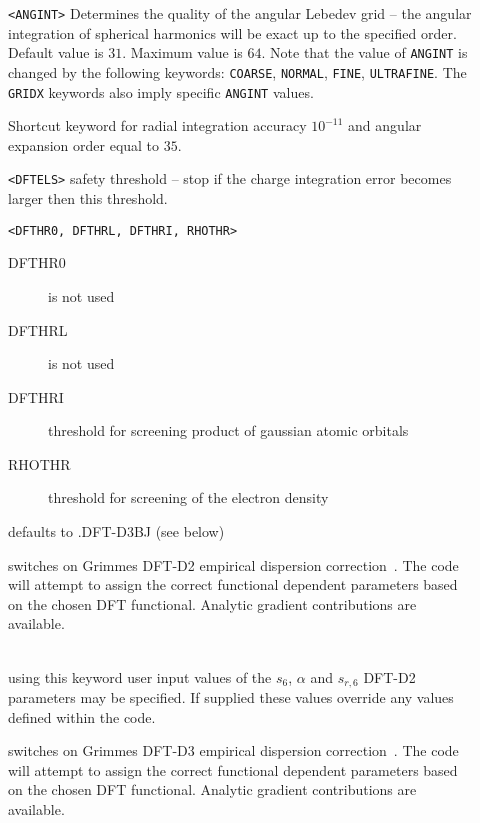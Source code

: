 \begin{description}
\item[] \verb||\newline
\verb|<ANGINT>|\newline
Determines the quality of the angular Lebedev grid -- the angular
integration of spherical harmonics will be exact up to the specified
order. Default value is $31$. Maximum value is $64$.
Note that the value of \verb|ANGINT| is changed by the following keywords:
\verb|COARSE|, \verb|NORMAL|, \verb|FINE|, \verb|ULTRAFINE|.
The \verb|GRIDX| keywords also imply specific \verb|ANGINT| values.
\item[]
Shortcut keyword for radial integration accuracy $10^{-11}$ and angular expansion order equal to $35$.
\item[] \verb||\newline
\verb|<DFTELS>|\newline
safety threshold -- stop if the charge integration error becomes larger then this threshold.
\item[]\verb||\newline
\verb|<DFTHR0, DFTHRL, DFTHRI, RHOTHR>|
\begin{description}
\item[DFTHR0] is not used 
\item[DFTHRL] is not used 
\item[DFTHRI] threshold for screening product of gaussian atomic orbitals
\item[RHOTHR] threshold for screening of the electron density 
\end{description}
\item[] defaults to .DFT-D3BJ (see below)
\item[] switches on Grimmes DFT-D2 empirical dispersion correction~\cite{dft:dftd2}. The code will attempt to assign the correct functional dependent parameters based on the chosen DFT functional. Analytic gradient contributions are available.
\item[]  \\ 
using this keyword user input values of the $s_6$, $\alpha$ and $s_{r,6}$ DFT-D2 parameters may be specified. If supplied these values override any values defined within the code.
\item[] switches on Grimmes DFT-D3 empirical dispersion correction~\cite{dft:dftd3}. The code will attempt to assign the correct functional dependent parameters based on the chosen DFT functional. Analytic gradient contributions are available.

\end{description}
